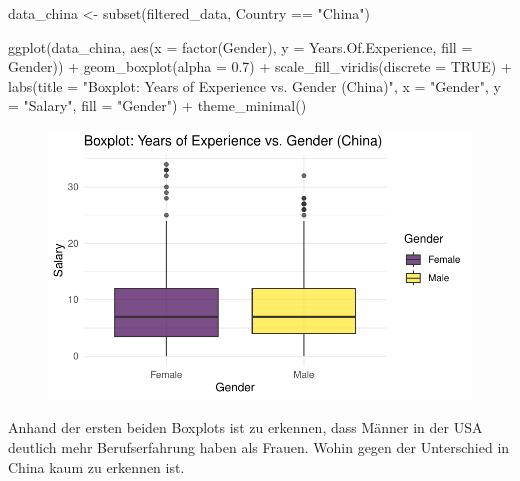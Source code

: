 \documentclass[
  letterpaper,
  DIV=11,
  numbers=noendperiod]{scrartcl}
\newenvironment{Shaded}{\begin{snugshade}}{\end{snugshade}}
\newcommand{\AttributeTok}[1]{\textcolor[rgb]{0.40,0.45,0.13}{#1}}
\newcommand{\ConstantTok}[1]{\textcolor[rgb]{0.56,0.35,0.01}{#1}}
\newcommand{\FloatTok}[1]{\textcolor[rgb]{0.68,0.00,0.00}{#1}}
\newcommand{\FunctionTok}[1]{\textcolor[rgb]{0.28,0.35,0.67}{#1}}
\newcommand{\NormalTok}[1]{\textcolor[rgb]{0.00,0.23,0.31}{#1}}
\newcommand{\OtherTok}[1]{\textcolor[rgb]{0.00,0.23,0.31}{#1}}
\newcommand{\SpecialCharTok}[1]{\textcolor[rgb]{0.37,0.37,0.37}{#1}}
\newcommand{\StringTok}[1]{\textcolor[rgb]{0.13,0.47,0.30}{#1}}
\begin{document}
\begin{Shaded}
\begin{Highlighting}[]
\NormalTok{data\_china }\OtherTok{\textless{}{-}} \FunctionTok{subset}\NormalTok{(filtered\_data, Country }\SpecialCharTok{==} \StringTok{"China"}\NormalTok{)}

\FunctionTok{ggplot}\NormalTok{(data\_china, }\FunctionTok{aes}\NormalTok{(}\AttributeTok{x =} \FunctionTok{factor}\NormalTok{(Gender), }\AttributeTok{y =}\NormalTok{ Years.Of.Experience, }\AttributeTok{fill =}\NormalTok{ Gender)) }\SpecialCharTok{+}
  \FunctionTok{geom\_boxplot}\NormalTok{(}\AttributeTok{alpha =} \FloatTok{0.7}\NormalTok{) }\SpecialCharTok{+}
  \FunctionTok{scale\_fill\_viridis}\NormalTok{(}\AttributeTok{discrete =} \ConstantTok{TRUE}\NormalTok{) }\SpecialCharTok{+}
  \FunctionTok{labs}\NormalTok{(}\AttributeTok{title =} \StringTok{"Boxplot: Years of Experience vs. Gender (China)"}\NormalTok{,}
       \AttributeTok{x =} \StringTok{"Gender"}\NormalTok{,}
       \AttributeTok{y =} \StringTok{"Salary"}\NormalTok{,}
       \AttributeTok{fill =} \StringTok{"Gender"}\NormalTok{) }\SpecialCharTok{+}
  \FunctionTok{theme\_minimal}\NormalTok{()}
\end{Highlighting}
\end{Shaded}

\begin{figure}[H]

{\centering \includegraphics{main_doc_files/figure-pdf/unnamed-chunk-68-1.pdf}

}

\end{figure}

Anhand der ersten beiden Boxplots ist zu erkennen, dass Männer in der
USA deutlich mehr Berufserfahrung haben als Frauen. Wohin gegen der
Unterschied in China kaum zu erkennen ist.
\end{document}
